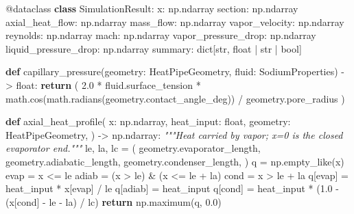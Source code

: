 \documentclass[
  12pt,
  12pt,a4paper,oneside]{report}
\newenvironment{Shaded}{}{}
\newcommand{\AttributeTok}[1]{\textcolor[rgb]{0.49,0.56,0.16}{#1}}
\newcommand{\BuiltInTok}[1]{\textcolor[rgb]{0.00,0.50,0.00}{#1}}
\newcommand{\CommentTok}[1]{\textcolor[rgb]{0.38,0.63,0.69}{\textit{#1}}}
\newcommand{\ControlFlowTok}[1]{\textcolor[rgb]{0.00,0.44,0.13}{\textbf{#1}}}
\newcommand{\FloatTok}[1]{\textcolor[rgb]{0.25,0.63,0.44}{#1}}
\newcommand{\KeywordTok}[1]{\textcolor[rgb]{0.00,0.44,0.13}{\textbf{#1}}}
\newcommand{\NormalTok}[1]{#1}
\newcommand{\OperatorTok}[1]{\textcolor[rgb]{0.40,0.40,0.40}{#1}}
\begin{document}
\begin{Shaded}
\begin{Highlighting}[]
\AttributeTok{@dataclass}
\KeywordTok{class}\NormalTok{ SimulationResult:}
\NormalTok{    x: np.ndarray}
\NormalTok{    section: np.ndarray}
\NormalTok{    axial\_heat\_flow: np.ndarray}
\NormalTok{    mass\_flow: np.ndarray}
\NormalTok{    vapor\_velocity: np.ndarray}
\NormalTok{    reynolds: np.ndarray}
\NormalTok{    mach: np.ndarray}
\NormalTok{    vapor\_pressure\_drop: np.ndarray}
\NormalTok{    liquid\_pressure\_drop: np.ndarray}
\NormalTok{    summary: }\BuiltInTok{dict}\NormalTok{[}\BuiltInTok{str}\NormalTok{, }\BuiltInTok{float} \OperatorTok{|} \BuiltInTok{str} \OperatorTok{|} \BuiltInTok{bool}\NormalTok{]}


\KeywordTok{def}\NormalTok{ capillary\_pressure(geometry: HeatPipeGeometry, fluid: SodiumProperties) }\OperatorTok{{-}\textgreater{}} \BuiltInTok{float}\NormalTok{:}
    \ControlFlowTok{return}\NormalTok{ (}
        \FloatTok{2.0} \OperatorTok{*}\NormalTok{ fluid.surface\_tension}
        \OperatorTok{*}\NormalTok{ math.cos(math.radians(geometry.contact\_angle\_deg))}
        \OperatorTok{/}\NormalTok{ geometry.pore\_radius}
\NormalTok{    )}


\KeywordTok{def}\NormalTok{ axial\_heat\_profile(}
\NormalTok{    x: np.ndarray, heat\_input: }\BuiltInTok{float}\NormalTok{, geometry: HeatPipeGeometry,}
\NormalTok{) }\OperatorTok{{-}\textgreater{}}\NormalTok{ np.ndarray:}
    \CommentTok{"""Heat carried by vapor; x=0 is the closed evaporator end."""}
\NormalTok{    le, la, lc }\OperatorTok{=}\NormalTok{ (}
\NormalTok{        geometry.evaporator\_length,}
\NormalTok{        geometry.adiabatic\_length,}
\NormalTok{        geometry.condenser\_length,}
\NormalTok{    )}
\NormalTok{    q }\OperatorTok{=}\NormalTok{ np.empty\_like(x)}
\NormalTok{    evap }\OperatorTok{=}\NormalTok{ x }\OperatorTok{\textless{}=}\NormalTok{ le}
\NormalTok{    adiab }\OperatorTok{=}\NormalTok{ (x }\OperatorTok{\textgreater{}}\NormalTok{ le) }\OperatorTok{\&}\NormalTok{ (x }\OperatorTok{\textless{}=}\NormalTok{ le }\OperatorTok{+}\NormalTok{ la)}
\NormalTok{    cond }\OperatorTok{=}\NormalTok{ x }\OperatorTok{\textgreater{}}\NormalTok{ le }\OperatorTok{+}\NormalTok{ la}
\NormalTok{    q[evap] }\OperatorTok{=}\NormalTok{ heat\_input }\OperatorTok{*}\NormalTok{ x[evap] }\OperatorTok{/}\NormalTok{ le}
\NormalTok{    q[adiab] }\OperatorTok{=}\NormalTok{ heat\_input}
\NormalTok{    q[cond] }\OperatorTok{=}\NormalTok{ heat\_input }\OperatorTok{*}\NormalTok{ (}\FloatTok{1.0} \OperatorTok{{-}}\NormalTok{ (x[cond] }\OperatorTok{{-}}\NormalTok{ le }\OperatorTok{{-}}\NormalTok{ la) }\OperatorTok{/}\NormalTok{ lc)}
    \ControlFlowTok{return}\NormalTok{ np.maximum(q, }\FloatTok{0.0}\NormalTok{)}



\end{Highlighting}
\end{Shaded}
\end{document}
